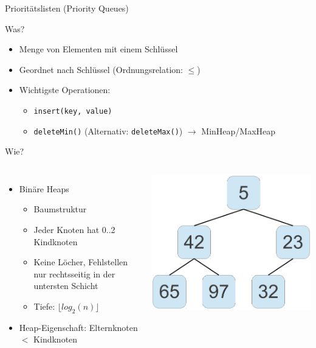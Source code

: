 \begin{frame}{Prioritätslisten (Priority Queues)}
	\begin{block}{Was?}
		\begin{itemize}
			\item Menge von Elementen mit einem Schlüssel
			\item Geordnet nach Schlüssel (Ordnungsrelation: $\le$)
			\item Wichtigste Operationen: 
			\begin{itemize}
				\item \texttt{insert(key, value)} 
				\item \texttt{deleteMin()} \tiny{(Alternativ: \texttt{deleteMax()}) $\rightarrow$ MinHeap/MaxHeap}
			\end{itemize}
		\end{itemize}
	\end{block}
	\pause
	\begin{block}{Wie?}
		\begin{columns}
				\vspace{-0.5em}
				\begin{itemize}
					\item Binäre Heaps
					\begin{itemize}
						\item Baumstruktur
						\item Jeder Knoten hat 0..2 Kindknoten
						\item Keine Löcher, Fehlstellen nur rechtsseitig in der untersten Schicht
						\item Tiefe: $\lfloor log_2(n) \rfloor$
					\end{itemize}
					\item Heap-Eigenschaft: Elternknoten $<$ Kindknoten
				\end{itemize}
				\includegraphics[width=0.95\linewidth]{images/heap.pdf}
		\end{columns}
	\end{block}
\end{frame}

